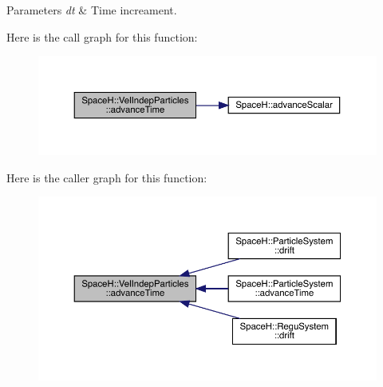 \begin{DoxyParams}{Parameters}
{\em dt} & Time increament. \\
\hline
\end{DoxyParams}
Here is the call graph for this function\+:
\nopagebreak
\begin{figure}[H]
\begin{center}
\leavevmode
\includegraphics[width=350pt]{class_space_h_1_1_vel_indep_particles_a3d72551854f8623412f0877e7847b4a9_cgraph}
\end{center}
\end{figure}
Here is the caller graph for this function\+:
\nopagebreak
\begin{figure}[H]
\begin{center}
\leavevmode
\includegraphics[width=350pt]{class_space_h_1_1_vel_indep_particles_a3d72551854f8623412f0877e7847b4a9_icgraph}
\end{center}
\end{figure}
\mbox{\label{class_space_h_1_1_vel_indep_particles_ac9344beddefc9182032c4966b70ff0c7}} 
